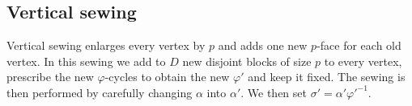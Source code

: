 \documentclass[11pt]{article}
\theoremstyle{remark}
\begin{document}
\subsection{Vertical sewing}
Vertical sewing enlarges every vertex by $p$ and adds one new $p$-face for
each old vertex.  %
In this sewing we add to $D$ new disjoint blocks of size $p$ to every vertex, prescribe the new $\varphi$-cycles to obtain the new $\varphi'$ and keep it fixed. The sewing is then performed by carefully changing $\alpha$ into $\alpha'$. We then set $\sigma'=\alpha' \varphi'^{-1}$.
\end{document}
